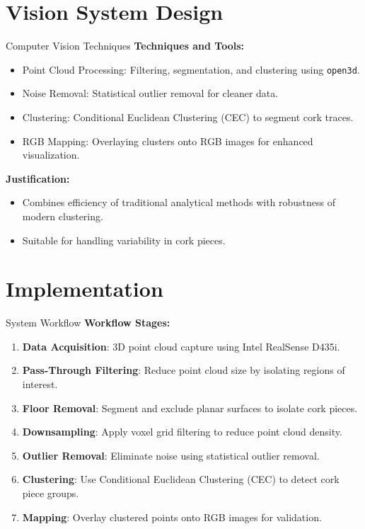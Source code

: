 \documentclass[10pt]{beamer}
\begin{document}
	\section{Vision System Design}
	\begin{frame}{Computer Vision Techniques}
		\textbf{Techniques and Tools:}
		\begin{itemize}
			\item Point Cloud Processing: Filtering, segmentation, and clustering using \texttt{open3d}.
			\item Noise Removal: Statistical outlier removal for cleaner data.
			\item Clustering: Conditional Euclidean Clustering (CEC) to segment cork traces.
			\item RGB Mapping: Overlaying clusters onto RGB images for enhanced visualization.
		\end{itemize}
		\textbf{Justification:}
		\begin{itemize}
			\item Combines efficiency of traditional analytical methods with robustness of modern clustering.
			\item Suitable for handling variability in cork pieces.
		\end{itemize}
	\end{frame}
	
\section{Implementation}
\begin{frame}{System Workflow}
	\textbf{Workflow Stages:}
	\begin{enumerate}
		\item \textbf{Data Acquisition}: 3D point cloud capture using Intel RealSense D435i.
		\item \textbf{Pass-Through Filtering}: Reduce point cloud size by isolating regions of interest.
		\item \textbf{Floor Removal}: Segment and exclude planar surfaces to isolate cork pieces.
		\item \textbf{Downsampling}: Apply voxel grid filtering to reduce point cloud density.
		\item \textbf{Outlier Removal}: Eliminate noise using statistical outlier removal.
		\item \textbf{Clustering}: Use Conditional Euclidean Clustering (CEC) to detect cork piece groups.
		\item \textbf{Mapping}: Overlay clustered points onto RGB images for validation.
	\end{enumerate}
\end{frame}
	
\end{document}

